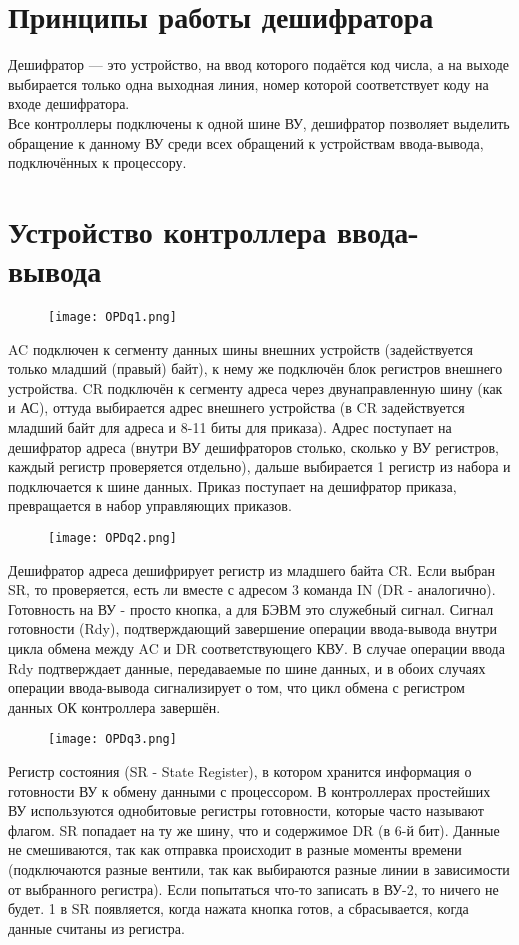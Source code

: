 \section{Принципы работы дешифратора}
Дешифратор — это устройство, на ввод которого подаётся код числа, а на выходе выбирается только одна выходная линия, номер которой соответствует коду на входе дешифратора. \\
Все контроллеры подключены к одной шине ВУ, дешифратор позволяет выделить обращение к данному ВУ среди всех обращений к устройствам ввода-вывода, подключённых к процессору. 

\section{Устройство контроллера ввода-вывода}
\begin{figure}[H]
    \centering
    \texttt{[image: OPDq1.png]}
\end{figure}
\noindent AC подключен к сегменту данных шины внешних устройств (задействуется только младший (правый) байт), к нему же подключён блок регистров внешнего устройства. CR подключён к сегменту адреса через двунаправленную шину (как и АС), оттуда выбирается адрес внешнего устройства (в CR задействуется младший байт для адреса и 8-11 биты для приказа). Адрес поступает на дешифратор адреса (внутри ВУ дешифраторов столько, сколько у ВУ регистров, каждый регистр проверяется отдельно), дальше выбирается 1 регистр из набора и подключается к шине данных. Приказ поступает на дешифратор приказа, превращается в набор управляющих приказов.
\begin{figure}[H]
    \centering
    \texttt{[image: OPDq2.png]}
\end{figure}
\noindent Дешифратор адреса дешифрирует регистр из младшего байта CR. Если выбран SR, то проверяется, есть ли вместе с адресом 3 команда IN (DR - аналогично). Готовность на ВУ - просто кнопка, а для БЭВМ это служебный сигнал. Сигнал готовности (Rdy), подтверждающий завершение операции ввода-вывода внутри цикла обмена между AC и DR соответствующего КВУ. В случае операции ввода Rdy подтверждает данные, передаваемые по шине данных, и в обоих случаях операции ввода-вывода сигнализирует о том, что цикл обмена с регистром данных ОК контроллера завершён.
\begin{figure}[H]
    \centering
    \texttt{[image: OPDq3.png]}
\end{figure}
\noindent Регистр состояния (SR - State Register), в котором хранится информация о готовности ВУ к обмену данными с процессором. В контроллерах простейших ВУ используются однобитовые регистры готовности, которые часто называют флагом. SR попадает на ту же шину, что и содержимое DR (в 6-й бит). Данные не смешиваются, так как отправка происходит в разные моменты времени (подключаются разные вентили, так как выбираются разные линии в зависимости от выбранного регистра). Если попытаться что-то записать в ВУ-2, то ничего не будет. 1 в SR появляется, когда нажата кнопка готов, а сбрасывается, когда данные считаны из регистра. 
